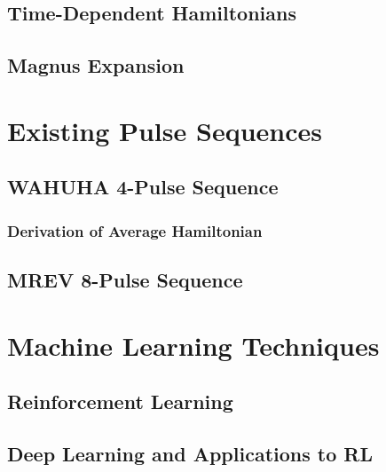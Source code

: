 \subsection{Time-Dependent Hamiltonians}

\subsection{Magnus Expansion}


\section{Existing Pulse Sequences}

\subsection{WAHUHA 4-Pulse Sequence}

\subsubsection{Derivation of Average Hamiltonian}

\subsection{MREV 8-Pulse Sequence}




\section{Machine Learning Techniques}


\subsection{Reinforcement Learning}


\subsection{Deep Learning and Applications to RL}


